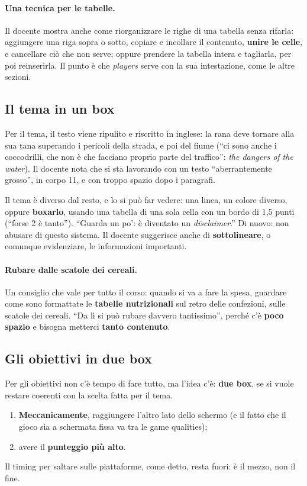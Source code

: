 \paragraph{Una tecnica per le tabelle.} Il docente mostra anche come
riorganizzare le righe di una tabella senza rifarla: aggiungere una riga
sopra o sotto, copiare e incollare il contenuto, \textbf{unire le celle}, e
cancellare ciò che non serve; oppure prendere la tabella intera e
tagliarla, per poi reinserirla. Il punto è che \emph{players} serve con la sua
intestazione, come le altre sezioni.

\subsection{Il tema in un box}

Per il tema, il testo viene ripulito e riscritto in inglese: la rana deve
tornare alla sua tana superando i pericoli della strada, e poi del fiume (``ci
sono anche i coccodrilli, che non è che facciano proprio parte del traffico'':
\emph{the dangers of the water}). Il docente nota che si sta lavorando con un
testo ``aberrantemente grosso'', in corpo 11, e con troppo spazio dopo i
paragrafi.

Il tema è diverso dal resto, e lo si può far vedere: una linea, un colore
diverso, oppure \textbf{boxarlo}, usando una tabella di una sola cella con un
bordo di 1,5 punti (``forse 2 è tanto''). ``Guarda un po': è diventato un
\emph{disclaimer}.'' Di nuovo: non abusare di questo sistema. Il docente
suggerisce anche di \textbf{sottolineare}, o comunque evidenziare, le
informazioni importanti.

\paragraph{Rubare dalle scatole dei cereali.} Un consiglio che vale per tutto
il corso: quando si va a fare la spesa, guardare come sono formattate le
\textbf{tabelle nutrizionali} sul retro delle confezioni, sulle scatole dei
cereali. ``Da lì si può rubare davvero tantissimo'', perché c'è
\textbf{poco spazio} e bisogna metterci \textbf{tanto contenuto}.

\subsection{Gli obiettivi in due box}

Per gli obiettivi non c'è tempo di fare tutto, ma l'idea c'è: \textbf{due
box}, se si vuole restare coerenti con la scelta fatta per il tema.
\begin{enumerate}
  \item \textbf{Meccanicamente}, raggiungere l'altro lato dello schermo (e il
        fatto che il gioco sia a schermata fissa va tra le game qualities);
  \item avere il \textbf{punteggio più alto}.
\end{enumerate}
Il timing per saltare sulle piattaforme, come detto, resta fuori: è il
mezzo, non il fine.

